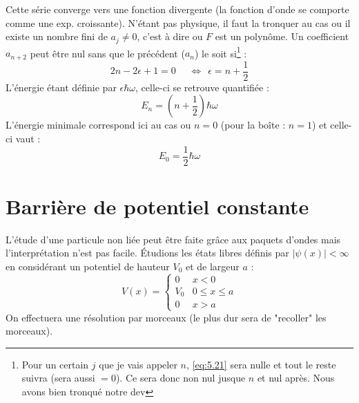 \documentclass	[11pt, a4paper, openany]{book}
\begin{document}
	Cette série converge vers une fonction divergente (la fonction d'onde se comporte comme une exp. croissante). N'étant pas physique, il faut la tronquer au cas ou il existe un nombre fini de $a_j \neq 0$, c'est à dire ou $F$ est un polynôme. Un coefficient $a_{n+2}$ peut être nul sans que le précédent ($a_n$) le soit si\footnote{Pour un certain $j$ que je vais appeler $n$, \eqref{eq:5.21} sera nulle et tout le reste suivra (sera aussi $=0$). Ce sera donc non nul jusque $n$ et nul après. Nous avons bien tronqué notre dev} :
	\begin{equation}
		2n-2\epsilon +1 = 0\  \ \ \ \ \ \Leftrightarrow\ \ \epsilon = n+\frac{1}{2}
	\end{equation}
	L'énergie étant définie par $\epsilon\hbar\omega$, celle-ci se retrouve quantifiée :
	\begin{equation}
		E_n = (n+\frac{1}{2})\hbar\omega
	\end{equation}
	L'énergie minimale correspond ici au cas ou $n=0$ (pour la boîte : $n=1$) et celle-ci vaut :
	\begin{equation}
		E_0 = \frac{1}{2}\hbar\omega
	\end{equation}
	
	
	\section{Barrière de potentiel constante}
	L'étude d'une particule non liée peut être faite grâce aux paquets d'ondes mais l'interprétation n'est pas facile. Étudions les états libres définis par $|\psi(x)|<\infty$ en considérant un potentiel de hauteur $V_0$ et de largeur $a$ :
	\begin{equation}
		V(x) = \left\{\begin{array}{ll}
		0 & x < 0\\
		V_0 & 0\leq x \leq a\\
		0 & x>a
		\end{array}\right.
	\end{equation}
	On effectuera une résolution par morceaux (le plus dur sera de "recoller" les morceaux).\\
	
\end{document}
